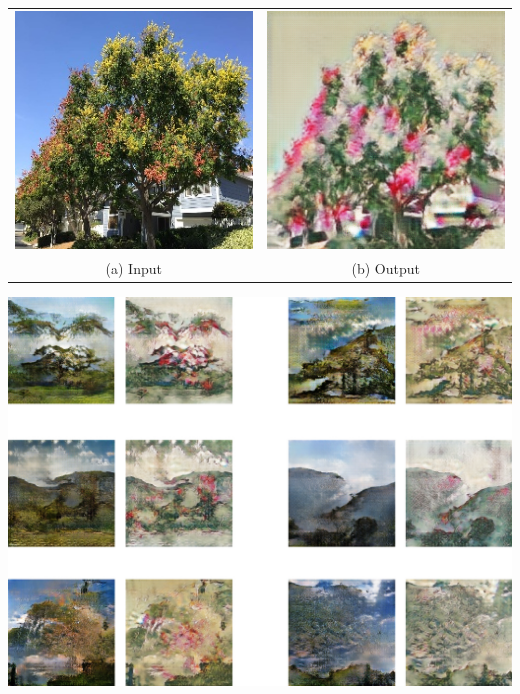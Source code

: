 \documentclass[a4paper, 12pt]{report}
\begin{document}
\vspace*{\baselineskip}

\begin{center}
  \centering
  \begin{tabular}{cc}
    \includegraphics[height=0.2\textheight]{images/cycle-gan-input.png}&
    \includegraphics[height=0.2\textheight]{images/cycle-gan-output.png}\\
    (a) Input &(b) Output
  \end{tabular}
\end{center}

\vspace*{\baselineskip}

\begin{center}
  \centering
    \includegraphics[width=0.9\linewidth]{images/cyclegan.jpg}
\end{center}
\end{document}
